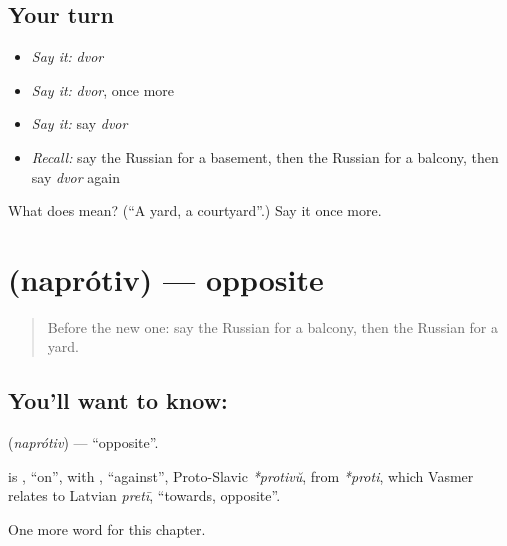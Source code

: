 \subsection*{Your turn}
\begin{itemize}
\raggedright
  \item \emph{Say it:} \emph{dvor}
  \item \emph{Say it:} \emph{dvor}, once more
  \item \emph{Say it:} say \emph{dvor}
  \item \emph{Recall:} say the Russian for a basement, then the Russian for a balcony, then say \emph{dvor} again
\end{itemize}

\begin{tcolorbox}[breakable,colback=teal!4,colframe=teal!35!black,title={Before you move on}]
What does  mean? (\textquotedblleft{}A yard, a courtyard\textquotedblright{}.) Say it once more.
\end{tcolorbox}
\section[\texorpdfstring{\ru{напротив} (naprótiv)}{напротив (naprótiv)}]{ (naprótiv) — opposite}

\label{lesson:RU-C241-naprotiv}



\begin{quote}
Before the new one: say the Russian for a balcony, then the Russian for a yard.
\end{quote}

\subsection*{You'll want to know: }
\textbf{} (\emph{naprótiv}) — \textquotedblleft{}opposite\textquotedblright{}.

\begin{cousinweb}
\textbf{} is \emph{}, \textquotedblleft{}on\textquotedblright{}, with \emph{}, \textquotedblleft{}against\textquotedblright{}, Proto-Slavic \emph{*protivŭ}, from \emph{*proti}, which Vasmer relates to Latvian \emph{pretī}, \textquotedblleft{}towards, opposite\textquotedblright{}.
\end{cousinweb}

\begin{grammarlens}[title={What you've built}]
One more word for this chapter.
\end{grammarlens}

